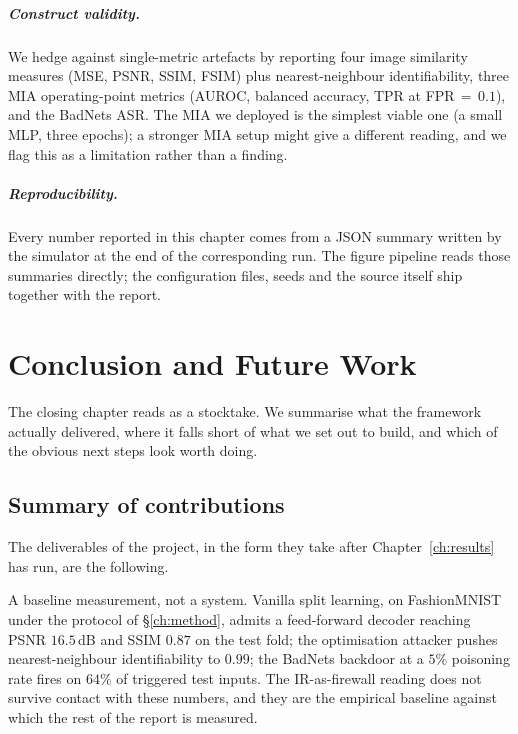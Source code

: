 \documentclass[11pt,a4paper,oneside]{report}
\begin{document}
\paragraph{Construct validity.}
We hedge against single-metric artefacts by reporting four image
similarity measures (MSE, PSNR, SSIM, FSIM) plus nearest-neighbour
identifiability, three MIA operating-point metrics (AUROC, balanced
accuracy, TPR at FPR\,$=$\,$0.1$), and the BadNets ASR. The MIA
we deployed is the simplest viable one (a small MLP, three epochs);
a stronger MIA setup might give a different reading, and we flag
this as a limitation rather than a finding.

\paragraph{Reproducibility.}
Every number reported in this chapter comes from a JSON summary
written by the simulator at the end of the corresponding run. The
figure pipeline reads those summaries directly; the configuration
files, seeds and the source itself ship together with the report.

\chapter{Conclusion and Future Work}
\label{ch:conclusion}

The closing chapter reads as a stocktake. We summarise what the
framework actually delivered, where it falls short of what we set
out to build, and which of the obvious next steps look worth doing.

\section{Summary of contributions}

The deliverables of the project, in the form they take after
Chapter~\ref{ch:results} has run, are the following.

A baseline measurement, not a system. Vanilla split learning, on
FashionMNIST under the protocol of \S\ref{ch:method}, admits a
feed-forward decoder reaching PSNR $16.5$\,dB and SSIM $0.87$ on
the test fold; the optimisation attacker pushes nearest-neighbour
identifiability to $0.99$; the BadNets backdoor at a $5\%$ poisoning
rate fires on $64\%$ of triggered test inputs. The IR-as-firewall
reading does not survive contact with these numbers, and they are
the empirical baseline against which the rest of the report is
measured.
\end{document}
